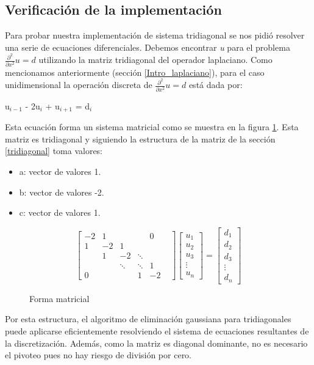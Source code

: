 \iffalse

    \subsection{Verificación de la implementación}
    Para probar nuestra implementación de sistema tridiagonal se nos pidió resolver una serie de ecuaciones diferenciales. Debemos encontrar \textit{u} para el problema $\frac{\partial^2}{\partial x^2}u = d$ utilizando la matriz tridiagonal del operador laplaciano.
    Como mencionamos anteriormente (sección \ref{Intro_laplaciano}), para el caso unidimensional la operación discreta de $\frac{\partial^2}{\partial x^2}u = d$ está dada por:

    u$_{i-1}$ - 2u$_{i}$ + u$_{i+1}$ = d$_{i}$

    Esta ecuación forma un sistema matricial como se muestra en la figura \ref{laplaciano}. Esta matriz es tridiagonal y siguiendo la estructura de la matriz de la sección \ref{tridiagonal} toma valores:

    \begin{itemize}
        \item a: vector de valores 1.
        \item b: vector de valores -2.
        \item c: vector de valores 1.
    \end{itemize}

    \begin{figure}[H]
        \[ \begin{bmatrix}
    -2 & 1 & & & 0\\
    1 & -2 & 1 & & & \\
        & 1 & -2 & \ddots & \\
        &    & \ddots &  \ddots & 1\\
    0   &    &   & 1 & -2
         \end{bmatrix}
         \begin{bmatrix}
               u_{1}\\
               u_{2} \\
               u_{3}\\ 
               \vdots\\ 
               u_{n}  
         \end{bmatrix}
          =
         \begin{bmatrix}
              d_{1} \\
              d_{2}\\
              d_{3}\\
           \vdots\\ 
           d_{n}  
        \end{bmatrix} \]
        \caption{Forma matricial}\label{laplaciano}
    \end{figure}
    Por esta estructura,  el algoritmo de eliminación gaussiana para tridiagonales puede aplicarse eficientemente resolviendo el sistema de ecuaciones resultantes de la discretización. Además, como la matriz es diagonal dominante, no es necesario el pivoteo pues no hay riesgo de división por cero. 
    
